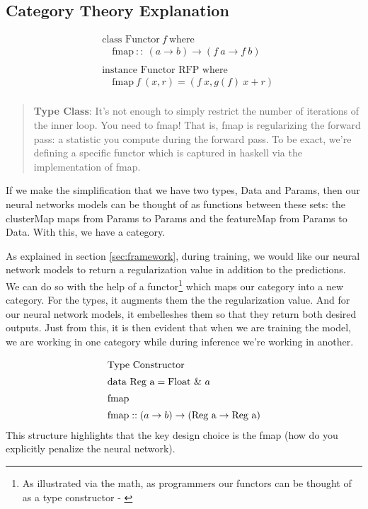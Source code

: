 \documentclass[a4paper,12pt]{article}
\begin{document}
\subsection{Category Theory Explanation}
\begin{align*}
&\textrm{class Functor} \ f \ \textrm{where} \\ 
&\quad \textrm{fmap} \ :: \ (a \to b) \to (f \ a \to f \ b) \\ \\ 
&\textrm{instance Functor RFP where} \\ 
&\quad \textrm{fmap} \ f \ (x, r) = (f \ x, g(f) \ x + r)  \\ 
\end{align*}
\begin{quote}
    \textbf{Type Class}: It's not enough to simply restrict the number of iterations of the inner loop. You need to fmap! That is, fmap is regularizing the forward pass: a statistic you compute during the forward pass. To be exact, we're defining a specific functor which is captured in haskell via the implementation of fmap. 
\end{quote}
If we make the simplification that we have two types, Data and Params, then our neural networks models can be thought of as functions between these sets: the clusterMap maps from Params to Params and the featureMap from Params to Data. With this, we have a category. \par 
As explained in section \ref{sec:framework}, during training, we would like our neural network models to return a regularization value in addition to the predictions. We can do so with the help of a functor\footnote{As illustrated via the math, as programmers our functors can be thought of as a type constructor - \cite{milewski2019category}} which maps our category into a new category. For the types, it augments them the the regularization value. And for our neural network models, it embelleshes them so that they return both desired outputs. Just from this, it is then evident that when we are training the model, we are working in one category while during inference we're working in another.\par 
\begin{align*}
\intertext{Type Constructor}
&\textrm{data Reg a} = \textrm{Float} \  \& \ a \\ 
\intertext{fmap}
&\textrm{fmap} :: (a \to b) \to (\textrm{Reg a}  \to \textrm{Reg a} )
\end{align*}
This structure highlights that the key design choice is the fmap (how do you explicitly penalize the neural network).
\end{document}
